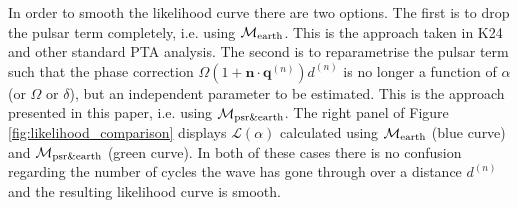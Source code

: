 \documentclass[fleqn,usenatbib,useAMS]{mnras}
\begin{document}
In order to smooth the likelihood curve there are two options. The first is to drop the pulsar term completely, i.e. using $\mathcal{M}_{\rm earth}$. This is the approach taken in K24 and other standard PTA analysis. The second is to reparametrise the pulsar term such that the phase correction $\Omega \left(1 + \boldsymbol{n}\cdot \boldsymbol{q}^{(n)} \right)  d^{(n)}$ is no longer a function of $\alpha$ (or $\Omega$ or $\delta$), but an independent parameter to be estimated. This is the approach presented in this paper, i.e. using $\mathcal{M}_{\rm psr \& earth}$. The right panel of Figure \ref{fig:likelihood_comparison} displays $\mathcal{L}(\alpha)$ calculated using $\mathcal{M}_{\rm earth}$ (blue curve) and $\mathcal{M}_{\rm psr \& earth}$ (green curve). In both of these cases there is no confusion regarding the number of cycles the wave has gone through over a distance $d^{(n)}$ and the resulting likelihood curve is smooth.










\bsp	%
\label{lastpage}
\end{document}
